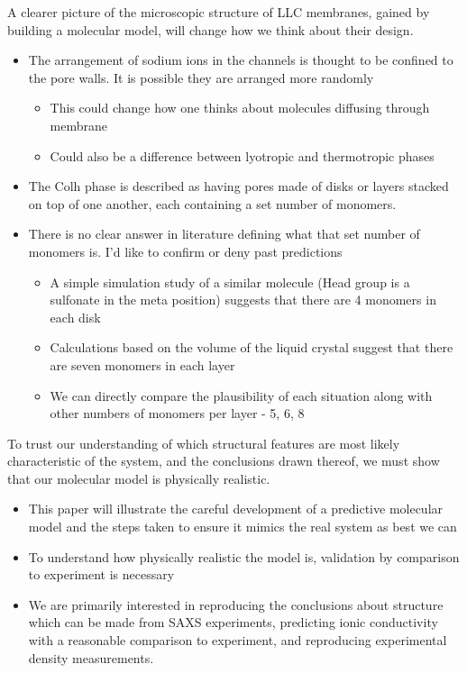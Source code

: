 \documentclass{article}
\begin{document}
	A clearer picture of the microscopic structure of LLC membranes, gained by building a molecular model, will change how we think about their design. 
	\begin{itemize}
		\item The arrangement of sodium ions in the channels is thought to be confined to the pore walls. It is possible they are arranged more randomly
		\begin{itemize}
			\item This could change how one thinks about molecules diffusing through membrane
			\item Could also be a difference between lyotropic and thermotropic phases
		\end{itemize}
		\item The Colh phase is described as having pores made of disks or layers stacked on top of one another, each containing a set number of monomers. 
		\item There is no clear answer in literature defining what that set number of monomers is. I'd like to confirm or deny past predictions
		\begin{itemize}
			\item A simple simulation study of a similar molecule (Head group is a sulfonate in the meta position) suggests that there are 4 monomers in each disk
			\item Calculations based on the volume of the liquid crystal suggest that there are seven monomers in each layer
			\item We can directly compare the plausibility of each situation along with other numbers of monomers per layer - 5, 6, 8
		\end{itemize}
	\end{itemize}
	
	To trust our understanding of which structural features are most likely characteristic of the system, and the conclusions drawn thereof, we must show that our molecular model is physically realistic.   
	\begin{itemize}
		\item This paper will illustrate the careful development of a predictive molecular model and the steps taken to ensure it mimics the real system as best we can 
		\item To understand how physically realistic the model is, validation by comparison to experiment is necessary
		\item We are primarily interested in reproducing the conclusions about structure which can be made from SAXS experiments, predicting ionic conductivity with a reasonable comparison to experiment, and reproducing experimental density measurements.          
	\end{itemize}
	
\end{document}
